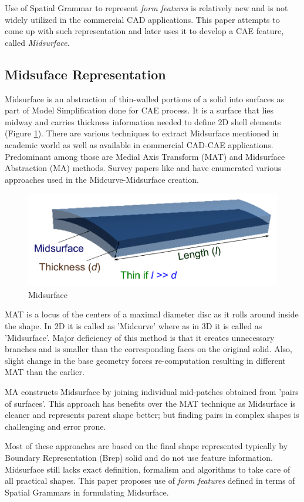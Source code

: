 Use of Spatial Grammar to represent {\em form features} is relatively new and is not widely utilized in the commercial CAD applications. This paper attempts to come up with such representation and later uses it to develop a CAE feature, called {\em Midsurface}.


\subsection{Midsuface Representation}

Midsurface is an abstraction of thin-walled portions of a solid into surfaces as part of Model Simplification done for CAE process. It is a surface that lies midway and carries thickness information needed to define 2D shell elements (Figure \ref{figure_Midsurf}). There are various techniques to extract Midsurface mentioned in academic world as well as available in commercial CAD-CAE applications. Predominant among those are Medial Axis Transform (MAT) and Midsurface Abstraction (MA) methods. Survey papers like \cite{Lam1992} and \cite{Attali2004}  have enumerated various approaches used in the Midcurve-Midsurface creation.

	\begin{figure}[h]
	\includegraphics[scale=0.4]{../Common/images//Midsurf.pdf}
	\caption{Midsurface}
	\label{figure_Midsurf}
	\end{figure}

MAT is a locus of the centers of a maximal diameter disc as it rolls around inside the shape. In 2D it is called as 'Midcurve' where as in 3D it is called as 'Midsurface'. Major deficiency of this method is that it creates unnecessary branches and is smaller than the corresponding faces on the original solid. Also, slight change in the base geometry forces re-computation resulting in different MAT than the earlier. 

MA constructs Midsurface by joining individual mid-patches obtained from 'pairs of surfaces'. This approach has benefits over the MAT technique as Midsurface is cleaner and represents parent shape better; but finding pairs in complex shapes is challenging and error prone. 

Most of these approaches are based on the final shape represented typically by Boundary Representation (Brep) solid and do not use feature information\cite{Smit2011}. Midsurface still lacks exact definition, formalism and algorithms to take care of all practical shapes. This paper proposes use of {\em form features} defined in terms of Spatial Grammars in formulating Midsurface.
